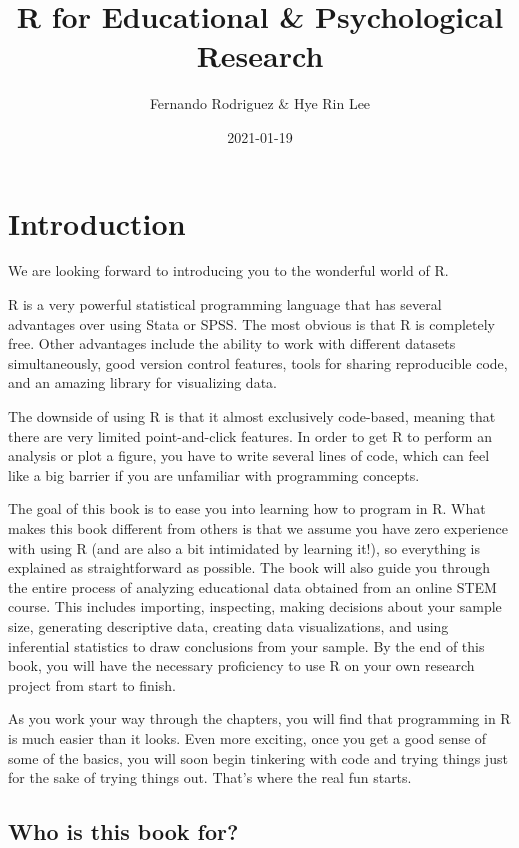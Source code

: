 \documentclass[
]{book}
\title{R for Educational \& Psychological Research}
\author{Fernando Rodriguez \& Hye Rin Lee}
\date{2021-01-19}
\begin{document}
\frontmatter
\maketitle

{
\setcounter{tocdepth}{1}
\tableofcontents
}
\mainmatter
\hypertarget{introduction}{%
\chapter{Introduction}\label{introduction}}

We are looking forward to introducing you to the wonderful world of R.

R is a very powerful statistical programming language that has several advantages over using Stata or SPSS. The most obvious is that R is completely free. Other advantages include the ability to work with different datasets simultaneously, good version control features, tools for sharing reproducible code, and an amazing library for visualizing data.

The downside of using R is that it almost exclusively code-based, meaning that there are very limited point-and-click features. In order to get R to perform an analysis or plot a figure, you have to write several lines of code, which can feel like a big barrier if you are unfamiliar with programming concepts.

The goal of this book is to ease you into learning how to program in R. What makes this book different from others is that we assume you have zero experience with using R (and are also a bit intimidated by learning it!), so everything is explained as straightforward as possible. The book will also guide you through the entire process of analyzing educational data obtained from an online STEM course. This includes importing, inspecting, making decisions about your sample size, generating descriptive data, creating data visualizations, and using inferential statistics to draw conclusions from your sample. By the end of this book, you will have the necessary proficiency to use R on your own research project from start to finish.

As you work your way through the chapters, you will find that programming in R is much easier than it looks. Even more exciting, once you get a good sense of some of the basics, you will soon begin tinkering with code and trying things just for the sake of trying things out. That's where the real fun starts.

\hypertarget{who-is-this-book-for}{%
\section{Who is this book for?}\label{who-is-this-book-for}}
\end{document}
